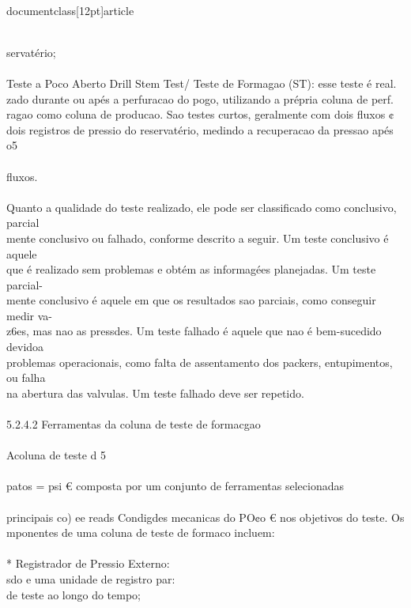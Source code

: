 \\documentclass[12pt]{article}
\begin{document}
\\
servatério;\\
\\
Teste a Poco Aberto Drill Stem Test/ Teste de Formagao (ST): esse teste é real.\\
zado durante ou apés a perfuracao do pogo, utilizando a prépria coluna de perf.\\
ragao como coluna de producao. Sao testes curtos, geralmente com dois fluxos ¢\\
dois registros de pressio do reservatério, medindo a recuperacao da pressao apés o5\\
\\
fluxos.\\
\\
Quanto a qualidade do teste realizado, ele pode ser classificado como conclusivo, parcial\\
mente conclusivo ou falhado, conforme descrito a seguir. Um teste conclusivo é aquele\\
que é realizado sem problemas e obtém as informagées planejadas. Um teste parcial-\\
mente conclusivo é aquele em que os resultados sao parciais, como conseguir medir va-\\
z6es, mas nao as pressdes. Um teste falhado é aquele que nao é bem-sucedido devidoa\\
problemas operacionais, como falta de assentamento dos packers, entupimentos, ou falha\\
na abertura das valvulas. Um teste falhado deve ser repetido.\\
\\
5.2.4.2 Ferramentas da coluna de teste de formacgao\\
\\
Acoluna de teste d 5\\
\\
patos = psi € composta por um conjunto de ferramentas selecionadas\\
\\
principais co) ee reads Condigdes mecanicas do PO¢o € nos objetivos do teste. Os\\
mponentes de uma coluna de teste de formaco incluem:\\
\\
* Registrador de Pressio Externo:\\
sdo e uma unidade de registro par:\\
de teste ao longo do tempo;\\
\\
\end{document}
